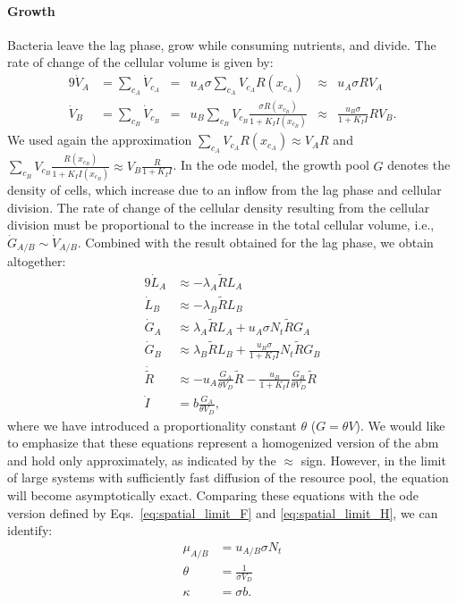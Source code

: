 \documentclass[10pt,1p,authoryear]{elsarticle}
\numberwithin{equation}{section}
\begin{document}
\paragraph{Growth}
Bacteria leave the lag phase, grow while consuming nutrients, and divide. The rate of change of the cellular volume is given by:
\begin{alignat}{9}
    \dot{V}_{A} &= \sum\limits_{c_A}\dot{V}_{c_A} &=&u_A\sigma\sum\limits_{c_A} V_{c_A} R(x_{c_A})&\approx& u_A\sigma R V_A\\
    \dot{V}_{B} &= \sum\limits_{c_B}\dot{V}_{c_B} &=&u_B\sum\limits_{c_B} V_{c_B}\frac{\sigma R(x_{c_B})}{1+K_I I(x_{c_B})}&\approx& \frac{u_B\sigma}{1+K_I I}RV_B. 
\end{alignat}
We used again the approximation $\sum\limits_{c_A} V_{c_A}R(x_{c_A})\approx V_AR$ and $\sum\limits_{c_B} V_{c_B}\frac{R(x_{c_B})}{1+K_I I(x_{c_B})}\approx  V_B\frac{R}{1+K_I I}$. In the \ac{ode} model, the growth pool $G$ denotes the density of cells, which increase due to an inflow from the lag phase and cellular division. The rate of change of the cellular density resulting from the cellular division must be proportional to the increase in the total cellular volume, i.e., $\dot{G}_{A/B}\sim\dot{V}_{A/B}$. Combined with the result obtained for the lag phase, we obtain altogether:
\begin{alignat}{9}
    \dot{L}_A &\approx -\lambda_A \tilde{R} L_A\\
    \dot{L}_B &\approx -\lambda_B \tilde{R} L_B\\
    \dot{G}_A &\approx \lambda_A \tilde{R} L_A+u_A\sigma N_t \tilde{R} G_A \\
    \dot{G}_B &\approx\lambda_B \tilde{R} L_B+\frac{u_B\sigma}{1+K_I I}N_t \tilde{R} G_B \\
    \dot{\tilde{R}} &\approx -u_A\frac{G_A}{\theta V_D} \tilde{R} -\frac{u_B}{1+K_I I} \frac{G_B}{\theta V_D} \tilde{R}\\
    \dot{I} &= b \frac{G_A}{\theta V_D},
\end{alignat}
where we have introduced a proportionality constant $\theta$ ($G=\theta V$). We would like to emphasize that these equations represent a homogenized version of the \acs{abm} and hold only approximately, as indicated by the $\approx$ sign. However, in the limit of large systems with sufficiently fast diffusion of the resource pool, the equation will become asymptotically exact. Comparing these equations with the \ac{ode} version defined by Eqs.~\eqref{eq:spatial_limit_F} and \eqref{eq:spatial_limit_H}, we can identify:
\begin{align}
    \mu_{A/B} &= u_{A/B}\sigma N_t\\
    \theta &= \frac{1}{\sigma V_D}\\
    \kappa &= \sigma b.
\end{align}
%
\end{document}
